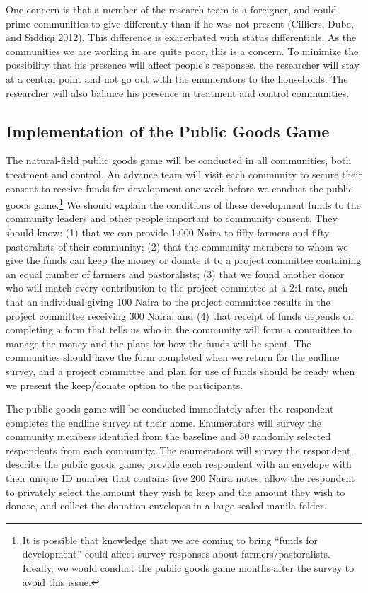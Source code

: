 \documentclass[
]{article}
\begin{document}
One concern is that a member of the research team is a foreigner, and
could prime communities to give differently than if he was not present
(Cilliers, Dube, and Siddiqi 2012). This difference is exacerbated with
status differentials. As the communities we are working in are quite
poor, this is a concern. To minimize the possibility that his presence
will affect people's responses, the researcher will stay at a central
point and not go out with the enumerators to the households. The
researcher will also balance his presence in treatment and control
communities.

\hypertarget{implementation-of-the-public-goods-game}{%
\subsection{Implementation of the Public Goods
Game}\label{implementation-of-the-public-goods-game}}

The natural-field public goods game will be conducted in all
communities, both treatment and control. An advance team will visit each
community to secure their consent to receive funds for development one
week before we conduct the public goods game.\footnote{It is possible
  that knowledge that we are coming to bring ``funds for development''
  could affect survey responses about farmers/pastoralists. Ideally, we
  would conduct the public goods game months after the survey to avoid
  this issue.} We should explain the conditions of these development
funds to the community leaders and other people important to community
consent. They should know: (1) that we can provide 1,000 Naira to fifty
farmers and fifty pastoralists of their community; (2) that the
community members to whom we give the funds can keep the money or donate
it to a project committee containing an equal number of farmers and
pastoralists; (3) that we found another donor who will match every
contribution to the project committee at a 2:1 rate, such that an
individual giving 100 Naira to the project committee results in the
project committee receiving 300 Naira; and (4) that receipt of funds
depends on completing a form that tells us who in the community will
form a committee to manage the money and the plans for how the funds
will be spent. The communities should have the form completed when we
return for the endline survey, and a project committee and plan for use
of funds should be ready when we present the keep/donate option to the
participants.

The public goods game will be conducted immediately after the respondent
completes the endline survey at their home. Enumerators will survey the
community members identified from the baseline and 50 randomly selected
respondents from each community. The enumerators will survey the
respondent, describe the public goods game, provide each respondent with
an envelope with their unique ID number that contains five 200 Naira
notes, allow the respondent to privately select the amount they wish to
keep and the amount they wish to donate, and collect the donation
envelopes in a large sealed manila folder.
\end{document}
